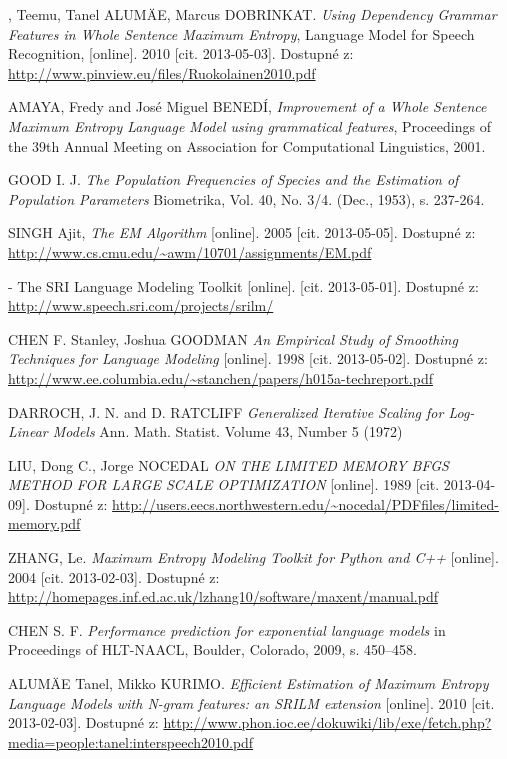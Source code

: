 \begin{thebibliography}{99}
, Teemu, Tanel ALUMÄE, Marcus DOBRINKAT. \emph{Using Dependency Grammar Features in Whole Sentence Maximum Entropy}, Language Model for Speech Recognition,
 [online]. 2010
  [cit. 2013-05-03].
  Dostupné z: \url{http://www.pinview.eu/files/Ruokolainen2010.pdf}  

{\sc AMAYA}, Fredy and José Miguel {\sc BENEDÍ}, \emph{Improvement of a Whole Sentence Maximum Entropy Language Model using grammatical features},
Proceedings of the 39th Annual Meeting on Association for Computational Linguistics, 2001.

{\sc GOOD} I. J. \emph{The Population Frequencies of Species and the Estimation of Population Parameters} Biometrika, Vol. 40, No. 3/4. (Dec., 1953), s. 237-264.

{\sc SINGH} Ajit, \emph{The EM Algorithm}
[online]. 2005
  [cit. 2013-05-05].
  Dostupné z: \url{http://www.cs.cmu.edu/~awm/10701/assignments/EM.pdf}  



 - The SRI Language Modeling Toolkit
 [online].
  [cit. 2013-05-01].
  Dostupné z: \url{http://www.speech.sri.com/projects/srilm/}  
  
{\sc CHEN} F. Stanley, Joshua {\sc GOODMAN} \emph{ An Empirical Study of Smoothing Techniques for Language Modeling}
 [online]. 1998
  [cit. 2013-05-02].
  Dostupné z: \url{http://www.ee.columbia.edu/~stanchen/papers/h015a-techreport.pdf}  
  
{\sc DARROCH}, J. N. and {\sc D. RATCLIFF} \emph{Generalized Iterative Scaling for Log-Linear Models} Ann. Math. Statist. Volume 43, Number 5 (1972)

{\sc LIU}, Dong C., Jorge {\sc NOCEDAL} \emph{ ON THE LIMITED MEMORY BFGS METHOD FOR
LARGE SCALE OPTIMIZATION}
 [online]. 1989
  [cit. 2013-04-09].
  Dostupné z: \url{http://users.eecs.northwestern.edu/~nocedal/PDFfiles/limited-memory.pdf}

{\sc ZHANG}, Le. \emph{Maximum Entropy Modeling Toolkit for Python and C++}
[online]. 2004
  [cit. 2013-02-03].
  Dostupné z: \url{http://homepages.inf.ed.ac.uk/lzhang10/software/maxent/manual.pdf}
  
{\sc CHEN} S. F. \emph{Performance prediction for exponential language models} in Proceedings of HLT-NAACL, Boulder, Colorado, 2009, s. 450–458.  

{\sc ALUMÄE} Tanel, Mikko {\sc KURIMO}. \emph{Efficient Estimation of Maximum Entropy Language Models with {N}-gram features: an {SRILM} extension}
[online]. 2010
  [cit. 2013-02-03].
  Dostupné z: \url{http://www.phon.ioc.ee/dokuwiki/lib/exe/fetch.php?media=people:tanel:interspeech2010.pdf}


\end{thebibliography}
